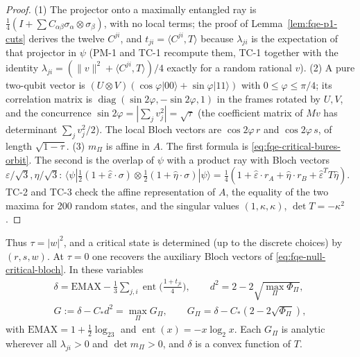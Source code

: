 \begin{proof}
(1) The projector onto a maximally entangled ray is $\tfrac14(I+\sum C_{\alpha\beta}\sigma_\alpha\otimes\sigma_\beta)$,
with no local terms; the proof of Lemma~\ref{lem:fqe-p1-cuts} derives the twelve $C^{ji}$, and $t_{ji}=\langle C^{ji},T\rangle$
because $\lambda_{ji}$ is the expectation of that projector in $\psi$ (PM-1 and TC-1 recompute them, TC-1 together
with the identity $\lambda_{ji}=(\|v\|^2+\langle C^{ji},T\rangle)/4$ exactly for a random rational $v$).
(2) A pure two-qubit vector is $(U\otimes V)(\cos\varphi|00\rangle+\sin\varphi|11\rangle)$ with $0\le\varphi\le\pi/4$; its
correlation matrix is $\operatorname{diag}(\sin2\varphi,-\sin2\varphi,1)$ in the frames rotated by $U,V$, and the concurrence
$\sin2\varphi=|\sum_jv_j^2|=\sqrt\tau$ (the coefficient matrix of $Mv$ has determinant $\sum_jv_j^2/2$).  The local Bloch
vectors are $\cos2\varphi\,r$ and $\cos2\varphi\,s$, of length $\sqrt{1-\tau}$.
(3) $m_\Pi$ is affine in $A$.  The first formula is \eqref{eq:fqe-critical-bures-orbit}.  The second is the overlap of
$\psi$ with a product ray with Bloch vectors $\varepsilon/\sqrt3,\eta/\sqrt3$:
$\langle\psi|\tfrac12(1+\hat\varepsilon\cdot\sigma)\otimes\tfrac12(1+\hat\eta\cdot\sigma)|\psi\rangle
=\tfrac14(1+\hat\varepsilon\cdot r_A+\hat\eta\cdot r_B+\hat\varepsilon^TT\hat\eta)$.
TC-2 and TC-3 check the affine representation of $A$, the equality of the two maxima for 200 random states, and the singular
values $(1,\kappa,\kappa)$, $\det T=-\kappa^2$.
\end{proof}
Thus $\tau=|w|^2$, and a critical state is determined (up to the discrete choices) by $(r,s,w)$.  At $\tau=0$ one recovers the
auxiliary Bloch vectors of \eqref{eq:fqe-null-critical-bloch}.  In these variables
\[
 \begin{gathered}
 \delta=\mathrm{EMAX}-\tfrac13\sum_{j,i}\operatorname{ent}\bigl(\tfrac{1+t_{ji}}4\bigr),\qquad
 d^2=2-2\sqrt{\max_\Pi\Phi_\Pi},\\
 G:=\delta-C_*d^2=\max_\Pi G_\Pi,\qquad G_\Pi=\delta-C_*(2-2\sqrt{\Phi_\Pi}),
 \end{gathered}
\]
with $\mathrm{EMAX}=1+\frac12\log_23$ and $\operatorname{ent}(x)=-x\log_2x$.  Each $G_\Pi$ is analytic wherever all $\lambda_{ji}>0$ and
$\det m_\Pi>0$, and $\delta$ is a convex function of $T$.

